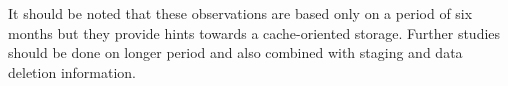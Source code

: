 

It should be noted that these observations are based only on a period of six months but they provide hints towards a cache-oriented storage. Further studies should be done on longer period and also combined with staging and data deletion information. 
